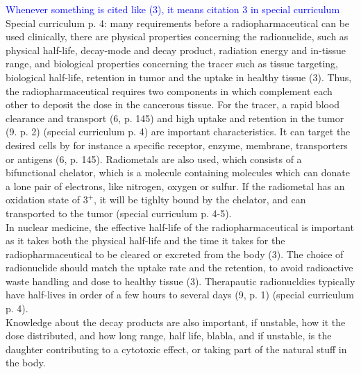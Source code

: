 \noindent    \textcolor{blue}{Whenever something is cited like (3), it means citation 3 in special curriculum}
Special curriculum p. 4: many requirements before a radiopharmaceutical can be used clinically, there are physical properties concerning the radionuclide, such as physical half-life, decay-mode and decay product, radiation energy and in-tissue range, and biological properties concerning the tracer such as tissue targeting, biological half-life, retention in tumor and the uptake in healthy tissue (3). Thus, the radiopharmaceutical requires two components in which complement each other to deposit the dose in the cancerous tissue. For the tracer, a rapid blood clearance and transport (6, p. 145) and high uptake and retention in the tumor (9. p. 2)    (special curriculum p. 4) are important characteristics. It can target the desired cells by for instance a specific receptor, enzyme, membrane, transporters or antigens (6, p. 145). Radiometals are also used, which consists of a bifunctional chelator, which is a molecule containing molecules which can donate a lone pair of electrons, like nitrogen, oxygen or sulfur. If the radiometal has an oxidation state of $3^+$, it will be tighlty bound by the chelator, and can transported to the tumor (special curriculum p. 4-5). \\

In nuclear medicine, the effective half-life of the radiopharmaceutical is important as it takes both the physical half-life and the time it takes for the radiopharmaceutical to be cleared or excreted from the body (3). The choice of radionuclide should match the uptake rate and the retention, to avoid radioactive waste handling and dose to healthy tissue (3). Therapautic radionucldies typically have half-lives  in order of a few hours to several days (9, p. 1) (special curriculum p. 4).\\

Knowledge about the decay products are also important, if unstable, how it the dose distributed, and how long range, half life, blabla, and if unstable, is the daughter contributing to a cytotoxic effect, or taking part of the natural stuff in the body. \\

